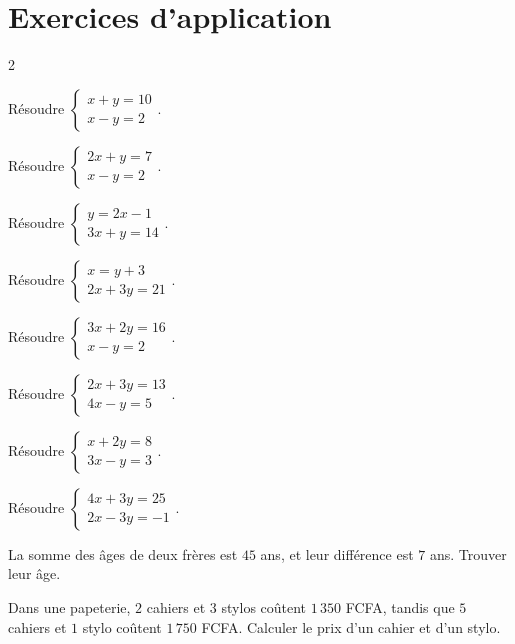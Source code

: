 \section{Exercices d'application}
\begin{multicols}{2}

\exo{} Résoudre $\left\{\begin{array}{l}x+y=10\\x-y=2\end{array}\right.$.

\exo{} Résoudre $\left\{\begin{array}{l}2x+y=7\\x-y=2\end{array}\right.$.

\exo{} Résoudre $\left\{\begin{array}{l}y=2x-1\\3x+y=14\end{array}\right.$.

\exo{} Résoudre $\left\{\begin{array}{l}x=y+3\\2x+3y=21\end{array}\right.$.

\exo{} Résoudre $\left\{\begin{array}{l}3x+2y=16\\x-y=2\end{array}\right.$.

\exo{} Résoudre $\left\{\begin{array}{l}2x+3y=13\\4x-y=5\end{array}\right.$.

\exo{} Résoudre $\left\{\begin{array}{l}x+2y=8\\3x-y=3\end{array}\right.$.

\exo{} Résoudre $\left\{\begin{array}{l}4x+3y=25\\2x-3y=-1\end{array}\right.$.

\exo{} La somme des âges de deux frères est $45$ ans, et leur différence est
$7$ ans. Trouver leur âge.

\exo{} Dans une papeterie, $2$ cahiers et $3$ stylos coûtent $1\,350$ FCFA, tandis
que $5$ cahiers et $1$ stylo coûtent $1\,750$ FCFA. Calculer le prix d'un cahier et d'un
stylo.


\end{multicols}

